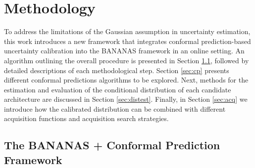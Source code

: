 \documentclass[a4paper,oneside,bibliography=totoc]{scrbook}
\begin{document}
\chapter{Methodology}
To address the limitations of the Gaussian assumption in uncertainty estimation, this work introduces a new framework that integrates conformal prediction-based uncertainty calibration into the BANANAS framework in an online setting. An algorithm outlining the overall procedure is presented in Section \ref{sec:overview}, followed by detailed descriptions of each methodological step. Section \ref{sec:cp} presents different conformal predictions algorithms to be explored. Next, methods for the estimation and evaluation of the conditional distribution of each candidate architecture are discussed in Section \ref{sec:distest}. Finally, in Section \ref{sec:acq} we introduce how the calibrated distribution can be combined with different acquisition functions and acquisition search strategies.


\section{The BANANAS + Conformal Prediction Framework}
\label{sec:overview}
\end{document}
